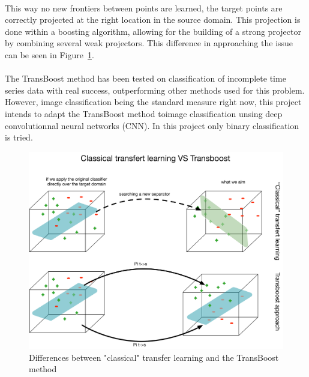 \documentclass[11 pt]{article}
\begin{document}
\paragraph{} This way no new frontiers between points are learned, the target points are correctly projected at the right location in the source domain. This projection is done within a boosting algorithm, allowing for the building of a strong projector by combining several weak projectors. This difference in approaching the issue can be seen in Figure~\ref{figDiff}. 


\paragraph{}The TransBoost method has been tested on classification of incomplete time series data with real success, outperforming other methods used for this problem. However, image classification being the standard measure right now, this project intends to adapt the TransBoost method toimage classification unsing deep convolutionnal neural networks (CNN). In this project only binary classification is tried.  

\begin{figure}[H]
  \includegraphics[width=\textwidth]{fig2.pdf}
  \caption{Differences between "classical" transfer learning and the TransBoost method}
  \label{figDiff}
\end{figure}
\end{document}
